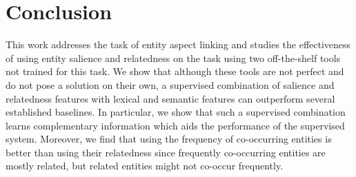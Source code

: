 \section{Conclusion}
\label{sec:Conclusion}
This work addresses the task of entity aspect linking and studies the effectiveness of using entity salience and relatedness on the task using two off-the-shelf tools not trained for this task. We show that although these tools are not perfect and do not pose a solution on their own, a supervised combination of salience and relatedness features with lexical and semantic features can outperform several established baselines. In particular, we show that such a supervised combination learns complementary information which aids the performance of the supervised system. Moreover, we find that using the frequency of co-occurring entities is better than using their relatedness since frequently co-occurring entities are mostly related, but related entities might not co-occur frequently. 
